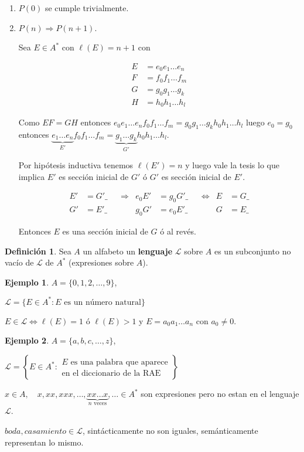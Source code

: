 \documentclass[a4paper,11pt]{article}
\theoremstyle{definition}
\newtheorem{defn}{Definición}[section]
\newtheorem{exap}{Ejemplo}[section]
\theoremstyle{remark}
\begin{document}
\begin{enumerate}
\item $P(0)$ se cumple trivialmente.
\item $P(n) \Rightarrow P(n+1)$.

Sea $E \in A^*$ con $\ell(E) = n+1$ con 

\[ 
\begin{align*}
E &= e_0e_1\dots e_n \\
F &= f_0f_1\dots f_m \\
G &= g_0g_1\dots g_k \\
H &= h_0h_1\dots h_l
\end{align*}
\]

Como $EF = GH$ entonces $e_0e_1\dots e_nf_0f_1\dots f_m = g_0g_1\dots g_kh_0h_1\dots h_l$
luego $e_0 = g_0$ entonces $\underbrace{e_1\dots e_n}_{E'}f_0f_1\dots f_m 
= \underbrace{g_1\dots g_k}_{G'}h_0h_1\dots h_l$.

Por hipótesis inductiva tenemos $\ell(E') = n$ y luego vale la tesis 
lo que implica $E'$ es sección inicial de $G'$ ó $G'$ es sección
inicial de $E'$.

\[
\begin{align*}
E' &= G'\_ & &\Rightarrow & e_0E' &= g_0 G'\_ & &\iff & E &= G\_\\
G' &= E'\_ & & & g_0 G' &= e_0 E'\_ & & & G &= E\_
\end{align*}
\]

Entonces $E$ es una sección inicial de $G$ ó al revés.
\end{enumerate}

\begin{defn}
Sea $A$ un alfabeto un \textbf{lenguaje} $\mathcal L$ sobre $A$ 
es un subconjunto no vacío de $\mathcal L$ de $A^*$ (expresiones sobre $A$).
\end{defn}

\begin{exap}
$A = \{0, 1, 2, \dots, 9\}$, 

$\mathcal L = \{ E \in A^* : 
E \textrm{ es un número natural} \}$

$E \in \mathcal L \iff \ell(E) = 1$ ó $\ell(E) > 1$ y 
$E = a_0a_1\dots a_n$ con $a_0 \ne 0$.
\end{exap}

\begin{exap}
$A = \{a, b, c, \dots, z\}$, 

$\mathcal L = \left\{ E \in A^* : 
\substack{E \text{ es una palabra que aparece} \\ \text{en el diccionario de la RAE}}\right\}$

$x \in A,\quad x, xx, xxx, \dots, \underbrace{xx\dots x}_{n\textrm{ veces}} 
, \dots\in A^*$ son expresiones pero no estan en el lenguaje $\mathcal L$.

$boda, casamiento \in \mathcal L$, sintácticamente no son iguales,
semánticamente representan lo mismo.
\end{exap}
\end{document}
